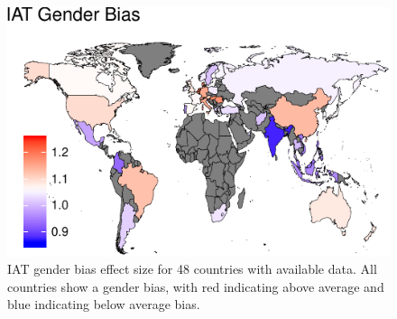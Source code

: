 \documentclass[10pt, letterpaper]{article}
\newenvironment{CodeChunk}{}{}
\begin{document}
\begin{CodeChunk}
\begin{figure}[t]

{\centering \includegraphics{figs/map-1} 

}

\caption[IAT gender bias effect size for 48 countries with available data]{IAT gender bias effect size for 48 countries with available data. All countries show a gender bias, with red indicating above average and blue indicating below average bias.}\label{fig:map}
\end{figure}
\end{CodeChunk}
\end{document}
